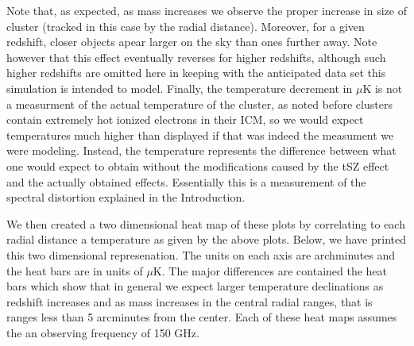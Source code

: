 \documentclass[12pt]{article} %
\begin{document}
Note that, as expected, as mass increases we observe the proper increase in size of cluster (tracked in this case by the radial distance). Moreover, for a given redshift, closer objects apear larger on the sky than ones further away. Note however that this effect eventually reverses for higher redshifts, although such higher redshifts are omitted here in keeping with the anticipated data set this simulation is intended to model. Finally, the temperature decrement in $\mu$K is not a measurment of the actual temperature of the cluster, as noted before clusters contain extremely hot ionized electrons in their ICM, so we would expect temperatures much higher than displayed if that was indeed the measument we were modeling. Instead, the temperature represents the difference between what one would expect to obtain without the modifications caused by the tSZ effect and the actually obtained effects. Essentially this is a measurement of the spectral distortion explained in the Introduction. 

We then created a two dimensional heat map of these plots by correlating to each radial distance a temperature as given by the above plots. Below, we have printed this two dimensional represenation. The units on each axis are archminutes and the heat bars are in units of $\mu$K. The major differences are contained the heat bars which show that in general we expect larger temperature declinations as redshift increases and as mass increases in the central radial ranges, that is ranges less than 5 arcminutes from the center.  Each of these heat maps assumes the an observing frequency of 150 GHz.
\end{document}
